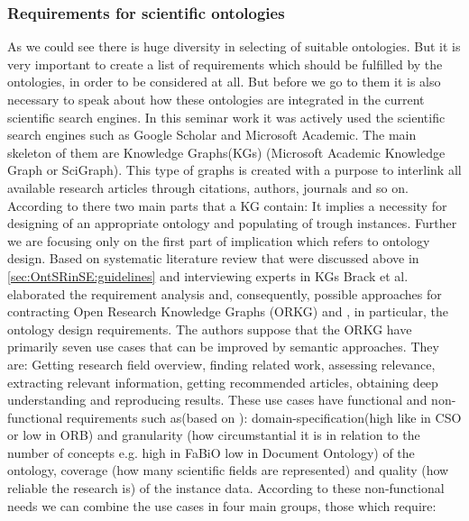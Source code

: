 		\subsubsection{Requirements for scientific ontologies}
		As we could see there is huge diversity in selecting of suitable ontologies. But it is very important to create a list of requirements which should be fulfilled by the ontologies, in order to be considered at all. But before we go to them it is also necessary to speak about how these ontologies are integrated in the current scientific search engines.
		In this seminar work it was actively used the scientific search engines such as Google Scholar and Microsoft Academic. The main skeleton of them are Knowledge Graphs(KGs) (Microsoft Academic Knowledge Graph or SciGraph). This type of graphs is created with a purpose to interlink all available research articles through citations, authors, journals and so on. According to \cite{Bra20} there two main parts that a KG contain: \frqq\cite[p. 1, footnote 3]{Bra20} It implies a necessity for designing of an appropriate ontology and populating of trough instances. Further we are focusing only on the first part of implication which refers to ontology design.
		Based on systematic literature review\cite{Kit07} that were discussed above in \autoref{sec:OntSRinSE:guidelines} and interviewing experts in KGs Brack et al. \cite{Bra20} elaborated the requirement analysis and, consequently, possible approaches for contracting Open Research Knowledge Graphs (ORKG) and , in particular, the ontology design requirements. The authors suppose that the ORKG have primarily seven use cases that can be improved by semantic approaches. They are: Getting research field overview, finding related work, assessing relevance, extracting relevant information, getting recommended articles,  obtaining deep understanding and reproducing results. These use cases have functional and non-functional requirements such as(based on \cite[p. 8]{Bra20}): domain-specification(high like in CSO or low in ORB) and granularity (how circumstantial it is in relation to the number of concepts e.g. high in FaBiO low in Document Ontology) of the ontology, coverage (how many scientific fields are represented) and quality (how reliable the research is) of the instance data. According to these non-functional needs we can combine the use cases in four main groups, those which require: 
